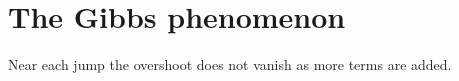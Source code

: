 \section{The Gibbs phenomenon}\label{sec:gibbs}
Near each jump the overshoot does not vanish as more terms are added.
